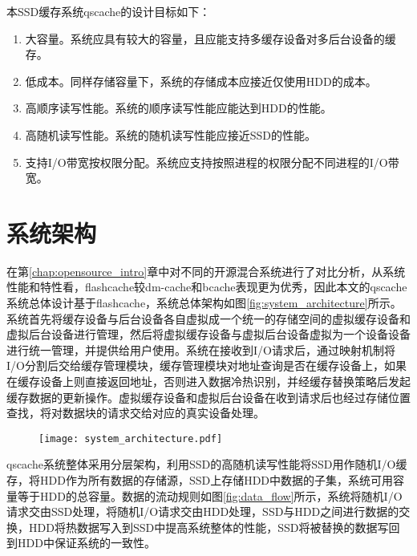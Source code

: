本SSD缓存系统qscache的设计目标如下：

\begin{enumerate}[wide]
    \item 大容量。系统应具有较大的容量，且应能支持多缓存设备对多后台设备的缓存。
    \item 低成本。同样存储容量下，系统的存储成本应接近仅使用HDD的成本。
    \item 高顺序读写性能。系统的顺序读写性能应能达到HDD的性能。
    \item 高随机读写性能。系统的随机读写性能应接近SSD的性能。
    \item 支持I/O带宽按权限分配。系统应支持按照进程的权限分配不同进程的I/O带宽。

\end{enumerate}

\section{系统架构}
\label{sec:qscache_architecture}

在第\ref{chap:opensource_intro}章中对不同的开源混合系统进行了对比分析，从系统性能和特性看，flashcache较dm-cache和bcache表现更为优秀，因此本文的qscache系统总体设计基于flashcache，系统总体架构如图\ref{fig:system_architecture}所示。系统首先将缓存设备与后台设备各自虚拟成一个统一的存储空间的虚拟缓存设备和虚拟后台设备进行管理，然后将虚拟缓存设备与虚拟后台设备虚拟为一个设备设备进行统一管理，并提供给用户使用。系统在接收到I/O请求后，通过映射机制将I/O分割后交给缓存管理模块，缓存管理模块对地址查询是否在缓存设备上，如果在缓存设备上则直接返回地址，否则进入数据冷热识别，并经缓存替换策略后发起缓存数据的更新操作。虚拟缓存设备和虚拟后台设备在收到请求后也经过存储位置查找，将对数据块的请求交给对应的真实设备处理。

\begin{figure}[H]
    \centering
    \texttt{[image: system\_architecture.pdf]}
\end{figure}

qscache系统整体采用分层架构，利用SSD的高随机读写性能将SSD用作随机I/O缓存，将HDD作为所有数据的存储源，SSD上存储HDD中数据的子集，系统可用容量等于HDD的总容量。数据的流动规则如图\ref{fig:data_flow}所示，系统将随机I/O请求交由SSD处理，将随机I/O请求交由HDD处理，SSD与HDD之间进行数据的交换，HDD将热数据写入到SSD中提高系统整体的性能，SSD将被替换的数据写回到HDD中保证系统的一致性。

